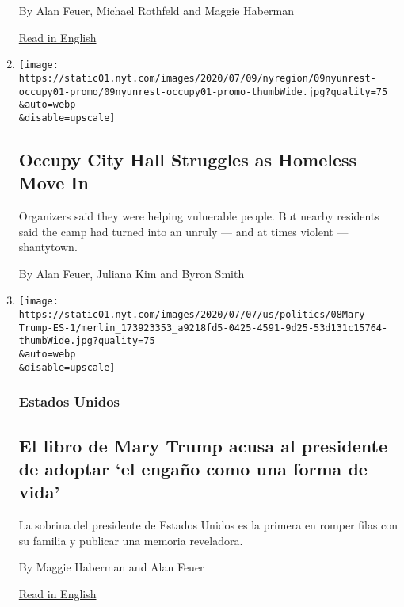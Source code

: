 \begin{enumerate}
  By Alan Feuer, Michael Rothfeld and Maggie Haberman

  \href{https://www.nytimes.com/2020/07/07/nyregion/mary-trump-book.html}{Read
  in English}
\item
  \href{/2020/07/09/nyregion/occupy-city-hall-nyc-homeless.html}{}

  \texttt{[image: https://static01.nyt.com/images/2020/07/09/nyregion/09nyunrest-occupy01-promo/09nyunrest-occupy01-promo-thumbWide.jpg?quality=75\\\&auto=webp\\\&disable=upscale]}

  \hypertarget{occupy-city-hall-struggles-as-homeless-move-in}{%
  \subsection{Occupy City Hall Struggles as Homeless Move
  In}\label{occupy-city-hall-struggles-as-homeless-move-in}}

  Organizers said they were helping vulnerable people. But nearby
  residents said the camp had turned into an unruly --- and at times
  violent --- shantytown.

  By Alan Feuer, Juliana Kim and Byron Smith
\item
  \href{/es/2020/07/08/espanol/mundo/libro-sobre-donald-trump.html}{}

  \texttt{[image: https://static01.nyt.com/images/2020/07/07/us/politics/08Mary-Trump-ES-1/merlin\_173923353\_a9218fd5-0425-4591-9d25-53d131c15764-thumbWide.jpg?quality=75\\\&auto=webp\\\&disable=upscale]}

  \hypertarget{estados-unidos}{%
  \subsubsection{Estados Unidos}\label{estados-unidos}}

  \hypertarget{el-libro-de-mary-trump-acusa-al-presidente-de-adoptar-el-engauxf1o-como-una-forma-de-vida}{%
  \subsection{El libro de Mary Trump acusa al presidente de adoptar `el
  engaño como una forma de
  vida'}\label{el-libro-de-mary-trump-acusa-al-presidente-de-adoptar-el-engauxf1o-como-una-forma-de-vida}}

  La sobrina del presidente de Estados Unidos es la primera en romper
  filas con su familia y publicar una memoria reveladora.

  By Maggie Haberman and Alan Feuer

  \href{https://www.nytimes.com/2020/07/07/us/politics/mary-trump-book.html}{Read
  in English}
\end{enumerate}

